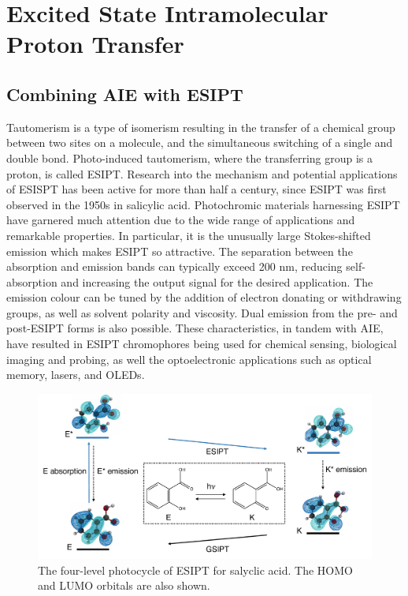 \section{Excited State Intramolecular Proton Transfer}\label{section: lom ESIPT}
\subsection{Combining AIE with ESIPT}
Tautomerism is a type of isomerism resulting in the transfer of a chemical group between two sites on a molecule, and the simultaneous switching of a single and double bond. Photo-induced tautomerism, where the transferring group is a proton, is called \acf{ESIPT}. Research into the mechanism and potential applications of ESISPT has been active for more than half a century, since \ac{ESIPT} was first observed in the 1950s in salicylic acid. Photochromic materials harnessing \ac{ESIPT} have garnered much attention due to the wide range of applications and remarkable properties. In particular, it is the unusually large Stokes-shifted emission which makes \ac{ESIPT} so attractive. The separation between the absorption and emission bands can typically exceed 200 nm, reducing self-absorption and increasing the output signal for the desired application. The emission colour can be tuned by the addition of electron donating or withdrawing groups, as well as solvent polarity and viscosity.\cite{Azarias2016,Yushchenko2007} Dual emission from the pre- and post-\ac{ESIPT} forms is also possible. These characteristics, in tandem with \ac{AIE}, have resulted in \ac{ESIPT} chromophores being used for chemical sensing, biological imaging and probing, as well the optoelectronic applications such as optical memory, lasers, and \acp{OLED}.\cite{Hsieh2010,Kwon2011,Zhao2012,Demchenko2013,Padalkar2015,Chen2018}
\begin{figure}[H]
\centering
  \includegraphics[width=0.95\linewidth]{1Intro/ESIPT.pdf}
  \caption[The four-level photocycle of \ac{ESIPT}]{The four-level photocycle of \ac{ESIPT} for salyclic acid. The HOMO and LUMO orbitals are also shown.}
  \label{figure: ESIPT}
\end{figure}
